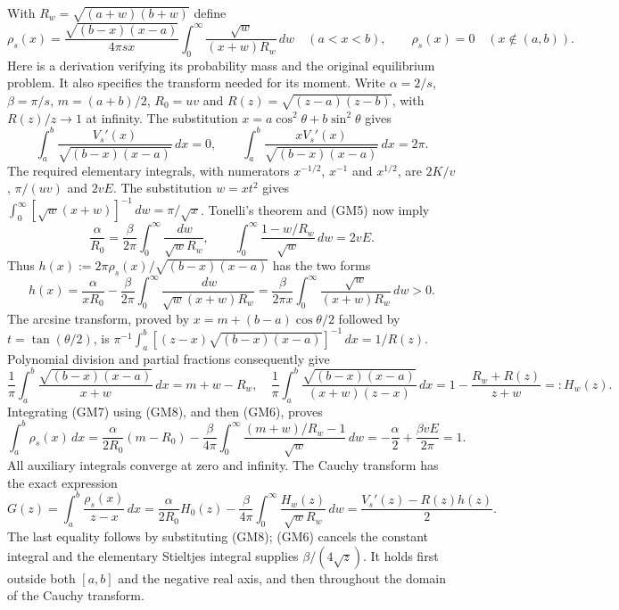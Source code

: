 \documentclass[11pt]{article}
\newcommand{\dd}{\,d}\newcommand{\R}{\mathbb R}
\begin{document}
With $R_w=\sqrt{(a+w)(b+w)}$ define
\begin{equation}\tag{GM4}
 \rho_s(x)=\frac{\sqrt{(b-x)(x-a)}}{4\pi s x}
       \int_0^\infty\frac{\sqrt w}{(x+w)R_w}\dd w\quad(a<x<b),
 \qquad \rho_s(x)=0\quad(x\notin(a,b)).
\end{equation}
Here is a derivation verifying its probability mass and the original
equilibrium problem. It also specifies the transform needed for its moment.
Write $\alpha=2/s$, $\beta=\pi/s$, $m=(a+b)/2$, $R_0=uv$ and
$R(z)=\sqrt{(z-a)(z-b)}$, with $R(z)/z\to1$ at infinity.
The substitution $x=a\cos^2\theta+b\sin^2\theta$ gives
\begin{equation}\tag{GM5}
 \int_a^b\frac{V_s'(x)}{\sqrt{(b-x)(x-a)}}\dd x=0,
 \qquad
 \int_a^b\frac{xV_s'(x)}{\sqrt{(b-x)(x-a)}}\dd x=2\pi.
\end{equation}
The required elementary integrals, with numerators $x^{-1/2}$,
$x^{-1}$ and $x^{1/2}$, are $2K/v$, $\pi/(uv)$ and $2vE$.
The substitution $w=xt^2$ gives
$\int_0^\infty[\sqrt w(x+w)]^{-1}\dd w=\pi/\sqrt x$.
Tonelli's theorem and (GM5) now imply
\begin{equation}\tag{GM6}
 \frac\alpha{R_0}=\frac\beta{2\pi}
       \int_0^\infty\frac{\dd w}{\sqrt wR_w},\qquad
 \int_0^\infty\frac{1-w/R_w}{\sqrt w}\dd w=2vE.
\end{equation}
Thus $h(x):=2\pi\rho_s(x)/\sqrt{(b-x)(x-a)}$ has the two forms
\begin{equation}\tag{GM7}
 h(x)=\frac\alpha{xR_0}-\frac\beta{2\pi}
       \int_0^\infty\frac{\dd w}{\sqrt w(x+w)R_w}
 =\frac\beta{2\pi x}\int_0^\infty\frac{\sqrt w}{(x+w)R_w}\dd w>0.
\end{equation}
The arcsine transform, proved by $x=m+(b-a)\cos\theta/2$ followed
by $t=\tan(\theta/2)$, is
$\pi^{-1}\int_a^b[(z-x)\sqrt{(b-x)(x-a)}]^{-1}\dd x=1/R(z)$.
Polynomial division and partial fractions consequently give
\begin{equation}\tag{GM8}
 \frac1\pi\int_a^b\frac{\sqrt{(b-x)(x-a)}}{x+w}\dd x=m+w-R_w,
 \quad
 \frac1\pi\int_a^b\frac{\sqrt{(b-x)(x-a)}}{(x+w)(z-x)}\dd x
 =1-\frac{R_w+R(z)}{z+w}=:H_w(z).
\end{equation}
Integrating (GM7) using (GM8), and then (GM6), proves
\begin{equation}\tag{GM9}
 \int_a^b\rho_s(x)\dd x
 =\frac\alpha{2R_0}(m-R_0)-\frac\beta{4\pi}
  \int_0^\infty\frac{(m+w)/R_w-1}{\sqrt w}\dd w
 =-\frac\alpha2+\frac{\beta vE}{2\pi}=1.
\end{equation}
All auxiliary integrals converge at zero and infinity. The Cauchy transform
has the exact expression
\begin{equation}\tag{GM10}
 G(z)=\int_a^b\frac{\rho_s(x)}{z-x}\dd x
 =\frac\alpha{2R_0}H_0(z)-\frac\beta{4\pi}
       \int_0^\infty\frac{H_w(z)}{\sqrt wR_w}\dd w
 =\frac{V_s'(z)-R(z)h(z)}2.
\end{equation}
The last equality follows by substituting (GM8); (GM6) cancels the
constant integral and the elementary Stieltjes integral supplies
$\beta/(4\sqrt z)$. It holds first outside both $[a,b]$ and the
negative real axis, and then throughout the domain of the Cauchy transform.
\end{document}
